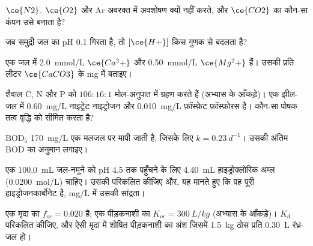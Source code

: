 \begin{exercise}[$\star$]\label{exo:b3:environmental-toxicology:1}
$\ce{N2}$, $\ce{O2}$ और Ar अवरक्त में अवशोषण क्यों नहीं करते, और $\ce{CO2}$ का कौन-सा कंपन उसे
 बनाता है?
\end{exercise}

\begin{exercise}[$\star$]\label{exo:b3:environmental-toxicology:2}
जब समुद्री जल का pH 0.1 गिरता है, तो $[\ce{H+}]$ किस गुणक से बदलता है?
\end{exercise}

\begin{exercise}[$\star$]\label{exo:b3:environmental-toxicology:3}
एक जल में \qty{2.0}{mmol/L} $\ce{Ca^2+}$ और \qty{0.50}{mmol/L} $\ce{Mg^2+}$ हैं। उसकी  प्रति लीटर $\ce{CaCO3}$ के mg में बताइए।
\end{exercise}

\begin{exercise}[$\star$]\label{exo:b3:environmental-toxicology:4}
शैवाल C, N और P को $106 : 16 : 1$ मोल-अनुपात में ग्रहण करते हैं (अभ्यास के आँकड़े)। एक झील-जल
में \qty{0.60}{mg/L} नाइट्रेट नाइट्रोजन और \qty{0.010}{mg/L} फ़ॉस्फ़ेट फ़ॉस्फ़ोरस है। कौन-सा पोषक तत्व
वृद्धि को सीमित करता है?
\end{exercise}

\begin{exercise}[$\star\star$]\label{exo:b3:environmental-toxicology:5}
$\mathrm{BOD_5}$ \qty{170}{mg/L} एक मलजल पर मापी जाती है, जिसके लिए $k = \qty{0.23}{d^{-1}}$। उसकी अंतिम BOD का अनुमान लगाइए।
\end{exercise}

\begin{exercise}[$\star\star$]\label{exo:b3:environmental-toxicology:6}
एक \qty{100.0}{mL} जल-नमूने को pH 4.5 तक पहुँचने के लिए \qty{4.40}{mL} हाइड्रोक्लोरिक अम्ल (\qty{0.0200}{mol/L}) चाहिए। उसकी
 परिकलित कीजिए और, यह मानते हुए कि वह पूरी हाइड्रोजनकार्बोनेट है, mg/L में उसकी सांद्रता।
\end{exercise}

\begin{exercise}[$\star\star$]\label{exo:b3:environmental-toxicology:7}
एक मृदा का $f_{oc} = 0.020$ है; एक पीड़कनाशी का $K_{oc} = \qty{300}{L/kg}$ (अभ्यास के आँकड़े)। $K_d$ परिकलित कीजिए, और
ऐसी मृदा में शोषित पीड़कनाशी का अंश जिसमें \qty{1.5}{kg} ठोस प्रति \qty{0.30}{L} रंध्र-जल हो।
\end{exercise}

